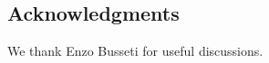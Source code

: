\documentclass[12pt]{article}
\begin{document}







\subsection*{Acknowledgments}
We thank Enzo Busseti 
for useful discussions.

% 


\end{document}
